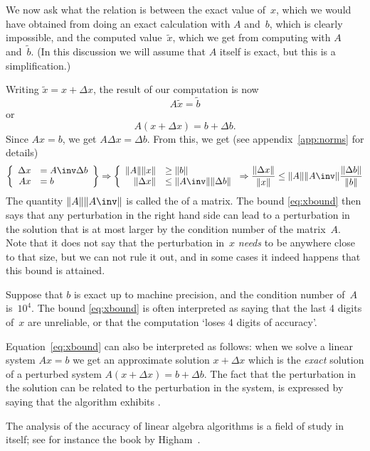 We now ask what the relation is between the exact value of~$x$, which
we would have obtained from doing an exact calculation with $A$
and~$b$, which is clearly impossible, and
the computed value~$\tilde x$, which we get from computing with $A$
and~$\tilde b$. (In this discussion we will assume that $A$ itself is
exact, but this is a simplification.)

Writing $\tilde x= x+\Delta x$, the result of our computation is now
\[ A\tilde x = \tilde b \] or \[ A(x+\Delta x)=b+\Delta b. \]
Since $Ax=b$, we get $A\Delta x=\Delta b$. From this, we get
(see appendix~\ref{app:norms} for details)
\begin{equation}
 \left \{
\begin{array}{rl}
  \Delta x&=A\inv \Delta b\\ Ax&=b
\end{array} \right\} \Rightarrow \left\{
\begin{array}{rl}
  \|A\| \|x\|&\geq\|b\| \\ \|\Delta x\|&\leq \|A\inv\| \|\Delta b\|
\end{array} \right.
\Rightarrow
\frac{\|\Delta x\|}{\|x\|}
\leq 
\|A\| \|A\inv\| \frac{\|\Delta b\|}{\|b\|}
    \label{eq:xbound}
\end{equation}
The quantity $\|A\| \|A\inv\|$ is called the  of a matrix. The bound \eqref{eq:xbound} then says that any
perturbation in the right hand side can lead to a perturbation in the
solution that is at most larger by the condition number of the
matrix~$A$. Note that it does not say that the perturbation in~$x$
\emph{needs} to be anywhere close to that size, but we can not rule it
out, and in some cases it indeed happens that this bound is attained.

Suppose that $b$ is exact up to machine precision, and the
condition number of~$A$ is~$10^4$. The bound \eqref{eq:xbound} is
often interpreted as saying that the last 4 digits of~$x$ are
unreliable, or that the computation `loses 4 digits of accuracy'.

Equation~\eqref{eq:xbound} can also be interpreted as follows: when we
solve a linear system $Ax=b$ we get an approximate solution $x+\Delta
x$ which is the \emph{exact} solution of a perturbed system
$A(x+\Delta x)=b+\Delta b$. The fact that the perturbation in the
solution can be related to the perturbation in the system, is
expressed by saying that the algorithm exhibits .

The analysis of the accuracy of linear algebra algorithms is a field
of study in itself; see for instance the book by
Higham~\cite{Higham:2002:ASN}.

